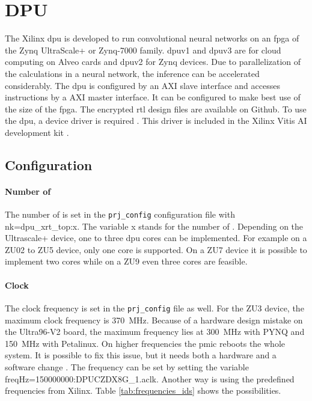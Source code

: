 \section{DPU}
\label{sec:embedded_platform:dpu}

The Xilinx \acrfull{dpu} is developed to run convolutional neural networks on an \acrshort{fpga} of the Zynq UltraScale+ or Zynq-7000 family.
\acrshort{dpu}v1 and \acrshort{dpu}v3 are for cloud computing on Alveo cards and \acrshort{dpu}v2 for Zynq devices. 
Due to parallelization of the calculations in a neural network, the inference can be accelerated considerably.
The \acrshort{dpu} is configured by an AXI slave interface and accesses instructions by a AXI master interface.
It can be configured to make best use of the size of the \acrshort{fpga}.
The encrypted \acrshort{rtl} design files are available on Github.
To use the \acrshort{dpu}, a device driver is required \cite{dpu_product_guide}.
This driver is included in the Xilinx Vitis AI development kit \cite{dpu_product_guide_v3_2}.

\subsection{Configuration}
\label{subsec:embedded_platform:dpu:configuration}
\paragraph{Number of }
The number of  is set in the \texttt{prj\_config} configuration file with nk=dpu\_xrt\_top:x.
The variable x stands for the number of .
Depending on the Ultrascale+ device, one to three \acrshort{dpu} cores can be implemented.
For example on a ZU02 to ZU5 device, only one core is supported.
On a ZU7 device it is possible to implement two cores while on a ZU9 even three cores are feasible.

\paragraph{Clock}
The clock frequency is set in the \texttt{prj\_config} file as well.
For the ZU3 device, the maximum clock frequency is \SI{370}{MHz}.
Because of a hardware design mistake on the Ultra96-V2 board, the maximum frequency lies at \SI{300}{MHz} with PYNQ and \SI{150}{MHz} with Petalinux.
On higher frequencies the \acrfull{pmic} reboots the whole system.
It is possible to fix this issue, but it needs both a hardware and a software change \cite{pmic_issue}.
The frequency can be set  by setting the variable  freqHz=150000000:DPUCZDX8G\_1.aclk.
Another way is using the predefined frequencies from Xilinx.
Table \ref{tab:frequencies_ids} shows the possibilities.

